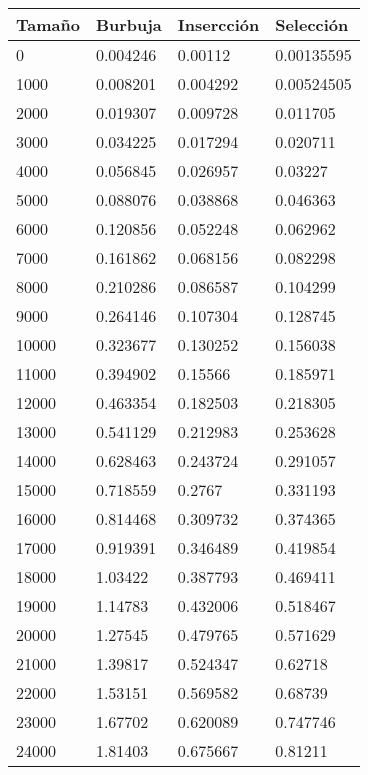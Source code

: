 \begin{tabular}[H]{|llll|}
\hline
\textbf{Tamaño} & \textbf{Burbuja} & \textbf{Insercción} & \textbf{Selección} \\ \hline
0 & 0.004246 & 0.00112 & 0.00135595 \\ \hline
1000 & 0.008201 & 0.004292 & 0.00524505 \\ \hline
2000 & 0.019307 & 0.009728 & 0.011705 \\ \hline
3000 & 0.034225 & 0.017294 & 0.020711 \\ \hline
4000 & 0.056845 & 0.026957 & 0.03227 \\ \hline
5000 & 0.088076 & 0.038868 & 0.046363 \\ \hline
6000 & 0.120856 & 0.052248 & 0.062962 \\ \hline
7000 & 0.161862 & 0.068156 & 0.082298 \\ \hline
8000 & 0.210286 & 0.086587 & 0.104299 \\ \hline
9000 & 0.264146 & 0.107304 & 0.128745 \\ \hline
10000 & 0.323677 & 0.130252 & 0.156038 \\ \hline
11000 & 0.394902 & 0.15566 & 0.185971 \\ \hline
12000 & 0.463354 & 0.182503 & 0.218305 \\ \hline
13000 & 0.541129 & 0.212983 & 0.253628 \\ \hline
14000 & 0.628463 & 0.243724 & 0.291057 \\ \hline
15000 & 0.718559 & 0.2767 & 0.331193 \\ \hline
16000 & 0.814468 & 0.309732 & 0.374365 \\ \hline
17000 & 0.919391 & 0.346489 & 0.419854 \\ \hline
18000 & 1.03422 & 0.387793 & 0.469411 \\ \hline
19000 & 1.14783 & 0.432006 & 0.518467 \\ \hline
20000 & 1.27545 & 0.479765 & 0.571629 \\ \hline
21000 & 1.39817 & 0.524347 & 0.62718 \\ \hline
22000 & 1.53151 & 0.569582 & 0.68739 \\ \hline
23000 & 1.67702 & 0.620089 & 0.747746 \\ \hline
24000 & 1.81403 & 0.675667 & 0.81211 \\ \hline

\end{tabular}